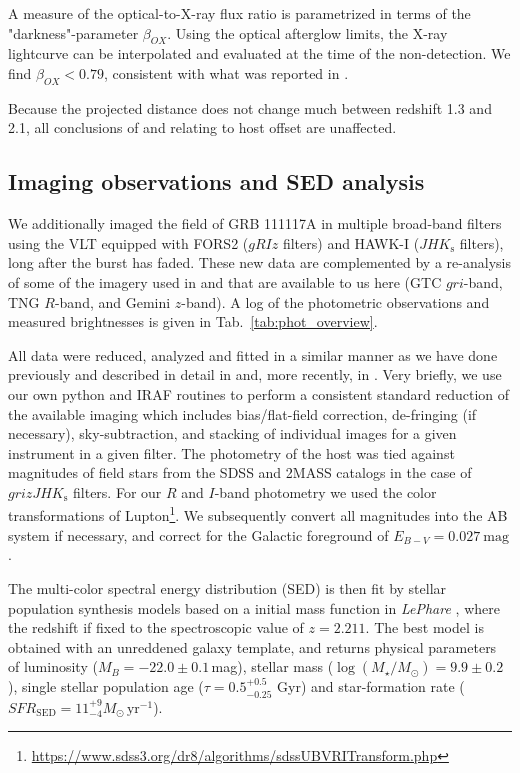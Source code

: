 \documentclass{aa}    %
\begin{document}
A measure of the optical-to-X-ray flux ratio is parametrized in terms of the "darkness"-parameter $\beta_{OX}$\citep{Jakobsson2004}. Using the optical afterglow limits\citep{Cucchiara2011, Cenko2011}, the X-ray lightcurve can be interpolated and evaluated at the time of the non-detection. We find $\beta_{OX} < 0.79$, consistent with what was reported in \citet{Sakamoto2013}.

Because the projected distance does not change much between redshift 1.3 and 2.1, all conclusions of \citet{Margutti2012} and \citet{Sakamoto2013} relating to host offset are unaffected. 

\subsection{Imaging observations and SED analysis} \label{SED}

We additionally imaged the field of GRB 111117A in multiple broad-band filters using the VLT equipped with FORS2 ($gRIz$ filters) and HAWK-I ($JHK_{\mathrm{s}}$ filters), long after the burst has faded. These new data are complemented by a re-analysis of some of the imagery used in \citet{Margutti2012} and \citet{Sakamoto2013} that are available to us here (GTC $gri$-band, TNG $R$-band, and Gemini $z$-band). A log of the photometric observations and measured brightnesses is given in Tab.~\ref{tab:phot_overview}.

All data were reduced, analyzed and fitted in a similar manner as we have done previously and described in detail in \citet{Kruhler2011a} and, more recently, in \citet{Schulze2016}. Very briefly, we use our own python and IRAF routines to perform a consistent standard reduction of the available imaging which includes bias/flat-field correction, de-fringing (if necessary), sky-subtraction, and stacking of individual images for a given instrument in a given filter. The photometry of the host was tied against magnitudes of field stars from the SDSS and 2MASS catalogs in the case of $grizJHK_{\mathrm{s}}$ filters. For our $R$ and $I$-band photometry we used the color transformations of Lupton\footnote{\url{https://www.sdss3.org/dr8/algorithms/sdssUBVRITransform.php}}. We subsequently convert all magnitudes into the AB system if necessary, and correct for the Galactic foreground of $E_{B-V}=0.027~\mathrm{mag}$.

The multi-color spectral energy distribution (SED) is then fit by \citet{Bruzual2003} stellar population synthesis models based on a \citet{Chabrier2003} initial mass function in \emph{LePhare} \citep{Ilbert2006}, where the redshift if fixed to the spectroscopic value of $z=2.211$. The best model is obtained with an unreddened galaxy template, and returns physical parameters of luminosity ($M_B=-22.0\pm0.1$\,mag), stellar mass ($\log(M_{\star}/M_\odot) = 9.9\pm0.2$), single stellar population age ($\tau = 0.5_{-0.25}^{+0.5}$ Gyr) and star-formation rate ($SFR_{\mathrm{SED}}=11_{-4}^{+9} M_\odot\,\mathrm{yr}^{-1}$). %
\end{document}
